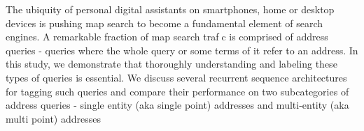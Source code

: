 The ubiquity of personal digital assistants on smartphones, home or desktop devices is pushing map search to become a fundamental element of search engines. A remarkable fraction of map search trafc is comprised of address queries - queries where the whole query or some terms of it refer to an address. In this study, we demonstrate that thoroughly understanding and labeling these types of queries is essential. We discuss several recurrent sequence architectures for tagging such queries and compare their performance on two subcategories of address queries - single entity (aka single point) addresses and multi-entity (aka multi point) addresses
